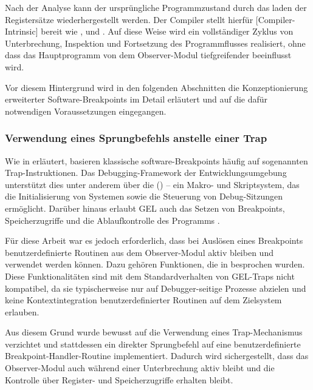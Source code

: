 Nach der Analyse kann der urspr\"ungliche Programmzustand durch das laden der Registers\"atze wiederhergestellt werden. Der Compiler stellt hierf\"ur [Compiler-Intrinsic] bereit wie ,  und  . Auf diese Weise wird ein vollst\"andiger Zyklus von Unterbrechung, Inspektion und Fortsetzung des Programmflusses realisiert, ohne dass das Hauptprogramm von dem Observer-Modul tiefgreifender beeinflusst wird.

Vor diesem Hintergrund wird in den folgenden Abschnitten die Konzeptionierung erweiterter Software-Breakpoints im Detail erl\"autert und auf die daf\"ur notwendigen Voraussetzungen eingegangen.


\newpage
\subsubsection{Verwendung eines Sprungbefehls anstelle einer Trap}
\label{sec:JumpVsTrap}

Wie in  erl\"autert, basieren klassische software-Breakpoints h\"aufig auf sogenannten Trap-Instruktionen. Das Debugging-Framework der Entwicklungsumgebung unterst\"utzt dies unter anderem \"uber die  () – ein Makro- und Skriptsystem, das die Initialisierung von Systemen sowie die Steuerung von Debug-Sitzungen erm\"oglicht. Dar\"uber hinaus erlaubt GEL auch das Setzen von Breakpoints, Speicherzugriffe und die Ablaufkontrolle des Programms .

F\"ur diese Arbeit war es jedoch erforderlich, dass bei Ausl\"osen eines Breakpoints benutzerdefinierte Routinen aus dem Observer-Modul aktiv bleiben und verwendet werden k\"onnen. Dazu geh\"oren Funktionen, die in  besprochen wurden. Diese Funktionalit\"aten sind mit dem Standardverhalten von GEL-Traps nicht kompatibel, da sie typischerweise nur auf Debugger-seitige Prozesse abzielen und keine Kontextintegration benutzerdefinierter Routinen auf dem Zielsystem erlauben.

Aus diesem Grund wurde bewusst auf die Verwendung eines Trap-Mechanismus verzichtet und stattdessen ein direkter Sprungbefehl auf eine benutzerdefinierte Breakpoint-Handler-Routine implementiert. Dadurch wird sichergestellt, dass das Observer-Modul auch w\"ahrend einer Unterbrechung aktiv bleibt und die Kontrolle \"uber Register- und Speicherzugriffe erhalten bleibt.


